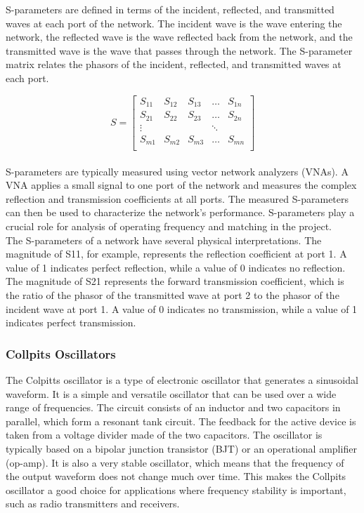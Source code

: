 \documentclass[]{extarticle}
\begin{document}
S-parameters are defined in terms of the incident, reflected, and transmitted waves at each port of the network. The incident wave is the wave entering the network, the reflected wave is the wave reflected back from the network, and the transmitted wave is the wave that passes through the network. The S-parameter matrix relates the phasors of the incident, reflected, and transmitted waves at each port.

\begin{equation}
    S = \begin{bmatrix}
        S_{11}&S_{12}&S_{13}&\dots&S_{1n}\\
        S_{21}&S_{22}&S_{23}&\dots&S_{2n}\\
        \vdots&&&\ddots&\\
        S_{m1}&S_{m2}&S_{m3}&\dots&S_{mn}\\
    \end{bmatrix}
    \label{eq: S-params}
\end{equation}
\\ 

S-parameters are typically measured using vector network analyzers (VNAs). A VNA applies a small signal to one port of the network and measures the complex reflection and transmission coefficients at all ports. The measured S-parameters can then be used to characterize the network's performance. S-parameters play a crucial role for analysis of operating frequency and matching in the project. \\


The S-parameters of a network have several physical interpretations. The magnitude of S11, for example, represents the reflection coefficient at port 1. A value of 1 indicates perfect reflection, while a value of 0 indicates no reflection. The magnitude of S21 represents the forward transmission coefficient, which is the ratio of the phasor of the transmitted wave at port 2 to the phasor of the incident wave at port 1. A value of 0 indicates no transmission, while a value of 1 indicates perfect transmission.


\subsubsection{Collpits Oscillators}

The Colpitts oscillator is a type of electronic oscillator that generates a sinusoidal waveform. It is a simple and versatile oscillator that can be used over a wide range of frequencies. The circuit consists of an inductor and two capacitors in parallel, which form a resonant tank circuit. The feedback for the active device is taken from a voltage divider made of the two capacitors. The oscillator is typically based on a bipolar junction transistor (BJT) or an operational amplifier (op-amp). It is also a very stable oscillator, which means that the frequency of the output waveform does not change much over time. This makes the Collpits oscillator a good choice for applications where frequency stability is important, such as radio transmitters and receivers. \\
\end{document}
